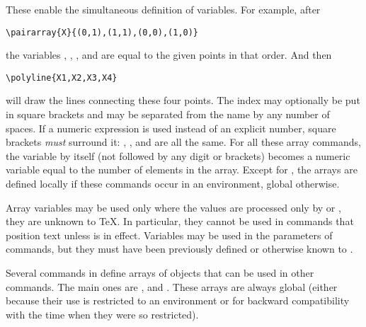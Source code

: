 \documentclass[letterpaper]{article}
\begin{document}
\begin{cd}
\\
\\
\\
\\
\\
%
%
%
%
%
%
\end{cd}

These enable the simultaneous definition of variables.
For example, after
\begin{verbatim}
\pairarray{X}{(0,1),(1,1),(0,0),(1,0)}
\end{verbatim}
the variables , , , and  are equal to
the given points in that order. And then
\begin{verbatim}
\polyline{X1,X2,X3,X4}
\end{verbatim}
will draw the lines connecting these four points. The index may
optionally be put in square brackets and may be separated from the name
by any number of spaces. If a numeric expression is used instead of an
explicit number, square brackets \emph{must} surround it: ,
,  and  are all the same. For all these array
commands, the variable  by itself (not followed by any digit or
brackets) becomes a numeric variable equal to the number of elements in
the array. Except for , the arrays are defined
locally if these commands occur in an  environment, global
otherwise.

Array variables may be used only where the values are processed only by
\MF{} or \MP{}, they are unknown to \TeX{}. In particular, they cannot be
used in commands that position text unless  is in effect.
Variables may be used in the  parameters of commands,
but they must have been previously defined or otherwise known to \MF{}.

Several commands in \mfp{} define arrays of objects that can be used in
other commands. The main ones are ,  and
. These arrays are always global (either because their
use is restricted to an  environment or for backward
compatibility with the time when they were so restricted).
\end{document}

